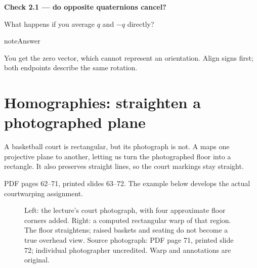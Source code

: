 \documentclass[letterpaper,11pt,english,openany,oneside]{jupyterBook}
\begin{document}
\begin{TextbookBox}
\textbf{Check 2.1 — do opposite quaternions cancel?}\par\smallskip

\sphinxAtStartPar
What happens if you average \(q\) and \(-q\) directly?

\end{TextbookBox}

\begin{sphinxadmonition}{note}{Answer}

\sphinxAtStartPar
You get the zero vector, which cannot represent an orientation. Align signs first; both endpoints describe the same rotation.
\end{sphinxadmonition}

\ignorespaces
\sphinxstepscope


\section{Homographies: straighten a photographed plane}
\label{\detokenize{lectures/lecture02/homographies:homographies-straighten-a-photographed-plane}}\label{\detokenize{lectures/lecture02/homographies:lec02-homographies}}\label{\detokenize{lectures/lecture02/homographies::doc}}
\sphinxAtStartPar
A basketball court is rectangular, but its photograph is not. A  maps one projective plane to another, letting us turn the photographed floor into a rectangle. It also preserves straight lines, so the court markings stay straight.

\sphinxAtStartPar
{} PDF pages 62–71, printed slides 63–72. The example below develops the actual court\sphinxhyphen{}warping assignment.

\begin{figure}[H]
\centering
\capstart

\noindent{}
\caption{Left: the lecture’s court photograph, with four approximate floor corners added. Right: a computed rectangular warp of that region. The floor straightens; raised baskets and seating do not become a true overhead view. Source photograph: PDF page 71, printed slide 72; individual photographer uncredited. Warp and annotations are original.}\label{\detokenize{lectures/lecture02/homographies:fig-lec02-court}}\end{figure}
\end{document}
